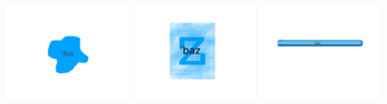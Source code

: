 \documentclass{beamer}
\begin{document}
{ %

\begin{frame}
    \includegraphics[width=4cm, trim= 4cm 4cm 4cm 4cm]{foo-instance}
    \includegraphics[width=4cm, trim= 4cm 4cm 4cm 4cm]{baz-instance}
    \includegraphics[width=4cm, trim= 4cm 4cm 4cm 4cm]{bar-instance}
\end{frame}

}
\end{document}
